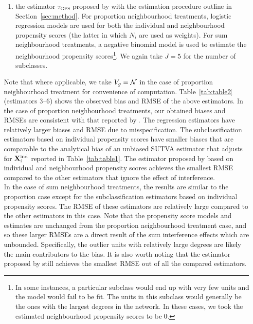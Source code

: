 \documentclass[10pt]{article}
\begin{document}
\begin{enumerate}
\item
the estimator $\tau_\text{GPS}$ proposed by \textcite{Forastiere:2021} with the estimation procedure outline in Section~\ref{sec:method}. For proportion neighbourhood treatments, logistic regression models are used for both the individual and neighbourhood propensity scores (the latter in which $N_i$ are used as weights). For sum neighbourhood treatments, a negative binomial model is used to estimate the neighbourhood propensity scores\footnote{In some instances, a particular subclass would end up with very few units and the model would fail to be fit. The units in this subclass would generally be the ones with the largest degrees in the network. In these cases, we took the estimated neighbourhood propensity scores to be 0.}. We again take $J=5$ for the number of subclasses.

\end{enumerate}
Note that where applicable, we take $V_g=\mathcal{N}$ in the case of proportion neighbourhood treatment for convenience of computation. Table~\ref{tab:table2} (estimators 3--6) shows the observed bias and RMSE of the above estimators. In the case of proportion neighbourhood treatments, our obtained biases and RMSEs are consistent with that reported by \textcite{Forastiere:2021}. The regression estimators have relatively larger biases and RMSE due to misspecification. The subclassification estimators based on individual propensity scores have smaller biases that are comparable to the analytical bias of an unbiased SUTVA estimator that adjusts for $\mathbf{X}^{\text{ind}}_i$ reported in Table~\ref{tab:table1}. The estimator proposed by \citeauthor{Forastiere:2021} based on individual and neighbourhood propensity scores achieves the smallest RMSE compared to the other estimators that ignore the effect of interference.
\\

In the case of sum neighbourhood treatments, the results are similar to the proportion case except for the subclassification estimators based on individual propensity scores. The RMSE of these estimators are relatively large compared to the other estimators in this case. Note that the propensity score models and estimates are unchanged from the proportion neighbourhood treatment case, and so these larger RMSEs are a direct result of the sum interference effects which are unbounded. Specifically, the outlier units with relatively large degrees are likely the main contributors to the bias. It is also worth noting that the estimator proposed by \citeauthor{Forastiere:2021} still achieves the smallest RMSE out of all the compared estimators.
\end{document}
